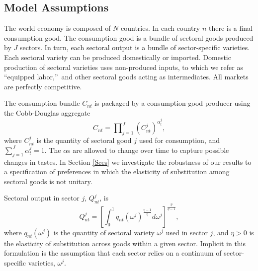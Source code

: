 \documentclass[12pt]{article}
\begin{document}
\subsection{Model Assumptions}

The world economy is composed of $N$ countries. In each country $n$ there is
a final consumption good. The consumption good is a bundle of sectoral goods
produced by $J$ sectors. In turn, each sectoral output is a bundle of
sector-specific varieties. Each sectoral variety can be produced
domestically or imported. Domestic production of sectoral varieties uses
non-produced inputs, to which we refer as \textquotedblleft equipped
labor,\textquotedblright\ and other sectoral goods acting as intermediates.
All markets are perfectly competitive.

The consumption bundle $C_{nt}$ is packaged by a consumption-good producer
using the Cobb-Douglas aggregate 
\begin{equation}
C_{nt}=\prod\nolimits_{j=1}^{J}\left( C_{nt}^{j}\right) ^{\alpha _{t}^{j}},
\label{aggregate}
\end{equation}%
where $C_{nt}^{j}$ is the quantity of sectoral good $j$ used for
consumption, and $\sum_{j=1}^{J}\alpha _{t}^{j}=1$. The $\alpha $s are
allowed to change over time to capture possible changes in tastes. 
In Section \ref{Sces} we investigate the robustness of our results to a
specification of preferences in which the elasticity of substitution among
sectoral goods is not unitary.

Sectoral output in sector $j$, $Q_{nt}^{j}$, is 
\begin{equation}
Q_{nt}^{j}=\left[ \int_{0}^{1}q_{nt}(\omega ^{j})^{\frac{\eta -1}{\eta }%
}d\omega ^{j}\right] ^{\frac{\eta }{\eta -1}},  \label{sectoroutput}
\end{equation}%
where $q_{nt}(\omega ^{j})$ is the quantity of sectoral variety $\omega ^{j}$
used in sector $j$, and $\eta >0$ is the elasticity of substitution across
goods within a given sector. Implicit in this formulation is the assumption
that each sector relies on a continuum of sector-specific varieties, $\omega
^{j}$.
\end{document}
